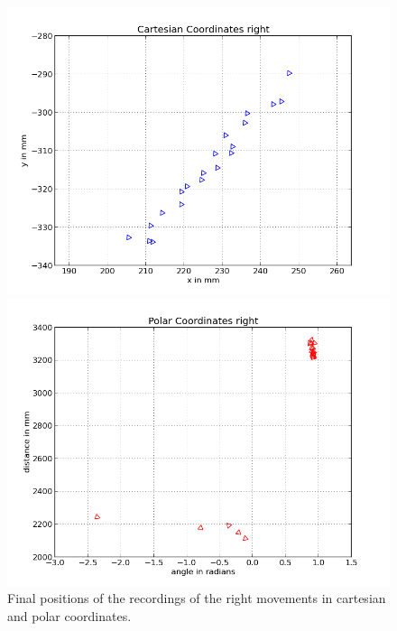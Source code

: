 \documentclass{scrartcl}
\begin{document}
\begin{figure}[H]
\centering
\begin{minipage}{.5\textwidth}
  \centering
  \includegraphics[width=.8\linewidth]{img/right_f.png}
\end{minipage}%
\begin{minipage}{.5\textwidth}
  \centering
  \includegraphics[width=.8\linewidth]{img/right_pc_f.png}
\end{minipage}
\caption{Final positions of the recordings of the right movements in cartesian and polar coordinates.}
\label{fig:right}
\end{figure}
\end{document}
